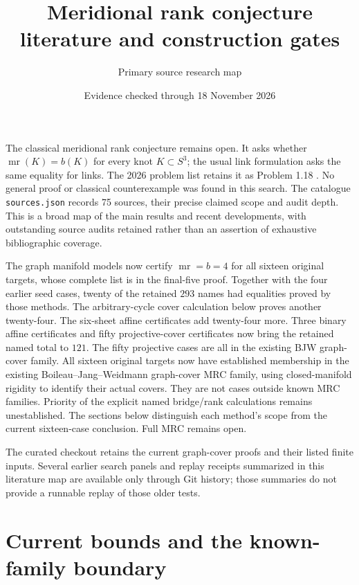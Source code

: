 \documentclass[11pt]{article}
\title{Meridional rank conjecture literature and construction gates}
\author{Primary source research map}
\date{Evidence checked through 18 November 2026}
\newcommand{\mr}{\operatorname{mr}}
\begin{document}
\maketitle

The classical meridional rank conjecture remains open. It asks whether
$\mr(K)=b(K)$ for every knot $K\subset S^3$; the usual link formulation asks
the same equality for links. The 2026 problem list retains it as Problem
1.18 \cite{k3}. No general proof or classical counterexample was found in
this search. The catalogue \texttt{sources.json} records 75 sources,
their precise claimed scope and audit depth. This is a broad map of the
main results and recent developments, with outstanding source audits
retained rather than an assertion of exhaustive bibliographic coverage.

The graph manifold models now certify $\mr=b=4$ for all sixteen original
targets, whose complete list is in the final-five proof.
Together with the four earlier
seed cases, twenty of the retained $293$ names had equalities proved by
those methods. The arbitrary-cycle cover calculation below proves
another twenty-four. The six-sheet affine certificates add twenty-four
more. Three binary affine certificates and fifty projective-cover
certificates now bring the retained named total to $121$. The fifty
projective cases are all in the existing BJW graph-cover family.
All sixteen original
targets now have established
membership in the existing Boileau--Jang--Weidmann graph-cover MRC family,
using closed-manifold rigidity to identify their actual covers.
They are not cases outside known MRC families. Priority of the explicit
named bridge/rank calculations remains unestablished.
The sections below distinguish each method's scope from the current
sixteen-case conclusion. Full MRC remains open.

The curated checkout retains the current graph-cover proofs and their
listed finite inputs. Several earlier search panels and replay receipts
summarized in this literature map are available only through Git history;
those summaries do not provide a runnable replay of those older tests.

\section{Current bounds and the known-family boundary}
\end{document}

